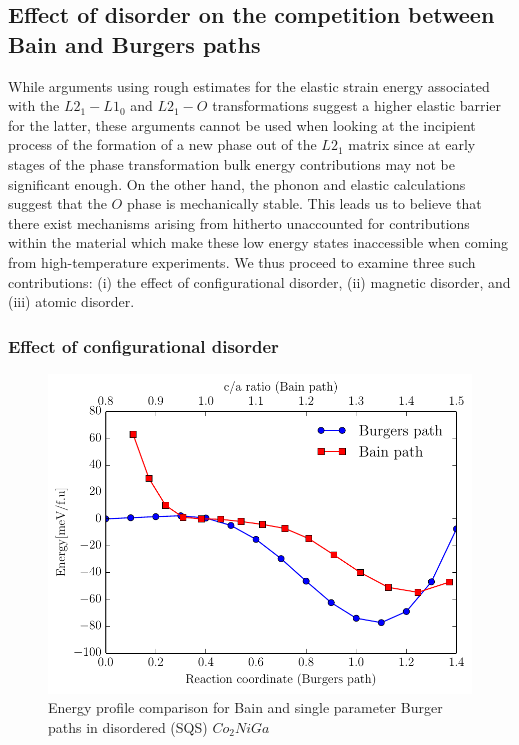 \documentclass[%
preprint,
 amsmath,amssymb,
 aps,
prb,
showkeys,
]{revtex4-1}
\begin{document}
\subsection{Effect of disorder on the competition between Bain and Burgers paths} 

While arguments using rough estimates for the elastic strain energy associated with the $L2_1-L1_0$ and $L2_1-O$ transformations suggest a higher elastic barrier for the latter, these arguments cannot be used when looking at the incipient process of the formation of a new phase out of the $L2_1$ matrix since at early stages of the phase transformation bulk energy contributions may not be significant enough. On the other hand, the phonon and elastic calculations suggest that the $O$ phase is mechanically stable. This leads us to believe that there exist mechanisms arising from hitherto unaccounted for contributions within the material which make these low energy states inaccessible when coming from high-temperature experiments. We thus proceed to examine three such contributions: (i) the effect of configurational disorder, (ii) magnetic disorder, and (iii) atomic disorder.

\subsubsection{Effect of configurational disorder}

\begin{figure}[htp!]
  \includegraphics[scale=1.0]{figure_8}
  \caption{Energy profile comparison for Bain and single parameter Burger  paths in  disordered (SQS) $Co_2NiGa$}
  \label{SQS}
\end{figure}
\end{document}
